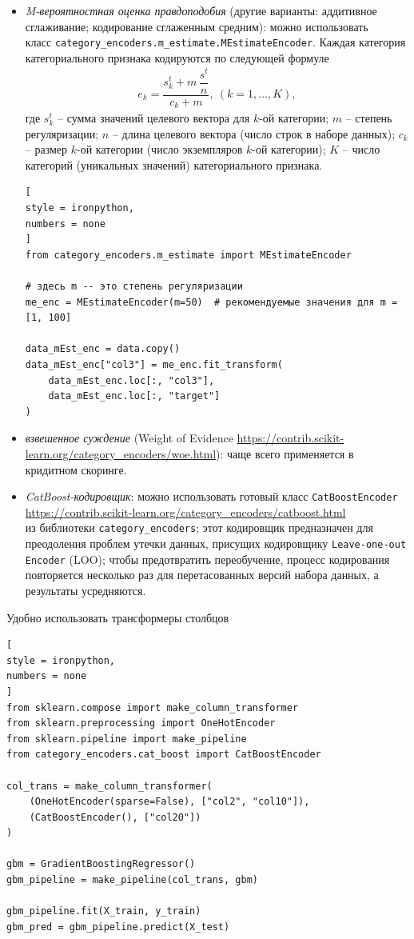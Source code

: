 \documentclass[%
	11pt,
	a4paper,
	utf8,
		]{article}
\begin{document}
\begin{itemize}
\begin{itemize}
    \item \emph{M-вероятностная оценка правдоподобия} (другие варианты: аддитивное сглаживание; кодирование сглаженным средним): можно использовать \\ класс \texttt{category\_encoders.m\_estimate.MEstimateEncoder}. Каждая категория категориального признака кодируются по следующей формуле
    \begin{align*}
        e_k = \dfrac{ s_k^t + m\, \dfrac{s^t}{n} }{c_k + m},\ (k = 1,\ldots, K),
    \end{align*}
    где $ s_k^t $ -- сумма значений целевого вектора для $ k $-ой категории; $ m $ -- степень регуляризации; $ n $ -- длина целевого вектора (число строк в наборе данных); $ c_k $ -- размер $ k $-ой категории (число экземпляров $ k $-ой категории); $ K $ -- число категорий (уникальных значений) категориального признака.
\begin{lstlisting}[
style = ironpython,
numbers = none	
]
from category_encoders.m_estimate import MEstimateEncoder

# здесь m -- это степень регуляризации
me_enc = MEstimateEncoder(m=50)  # рекомендуемые значения для m = [1, 100]

data_mEst_enc = data.copy()
data_mEst_enc["col3"] = me_enc.fit_transform(
    data_mEst_enc.loc[:, "col3"],
    data_mEst_enc.loc[:, "target"]
)
\end{lstlisting}

    \item \emph{взвешенное суждение} (Weight of Evidence \url{https://contrib.scikit-learn.org/category_encoders/woe.html}): чаще всего применяется в кридитном скоринге.
    
    \item \emph{CatBoost-кодировщик}: можно использовать готовый класс \texttt{CatBoostEncoder} \url{https://contrib.scikit-learn.org/category_encoders/catboost.html}\\ из библиотеки \texttt{category\_encoders}; этот кодировщик предназначен для преодоления проблем утечки данных, присущих кодировщику \texttt{Leave-one-out Encoder} (LOO); чтобы предотвратить переобучение, процесс кодирования повторяется несколько раз для перетасованных версий набора данных, а результаты усредняются.
    \end{itemize}
\end{itemize}

Удобно использовать трансформеры столбцов
\begin{lstlisting}[
style = ironpython,
numbers = none	
]
from sklearn.compose import make_column_transformer
from sklearn.preprocessing import OneHotEncoder
from sklearn.pipeline import make_pipeline
from category_encoders.cat_boost import CatBoostEncoder

col_trans = make_column_transformer(
    (OneHotEncoder(sparse=False), ["col2", "col10"]),
    (CatBoostEncoder(), ["col20"])
)

gbm = GradientBoostingRegressor()
gbm_pipeline = make_pipeline(col_trans, gbm)

gbm_pipeline.fit(X_train, y_train)
gbm_pred = gbm_pipeline.predict(X_test)
\end{lstlisting}
\end{document}
